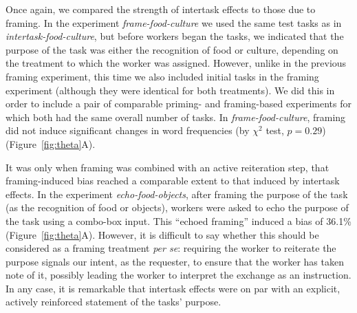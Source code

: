 \documentclass{sigchi}
\begin{document}
Once again, we compared the strength of intertask effects to those due to 
framing. In the experiment \textit{frame-food-culture} we used
the same test tasks as in \textit{intertask-food-culture}, but before
workers began the tasks, we indicated
that the purpose of the task was either the recognition of food or 
culture, depending on the treatment to which the worker was assigned.  
However, unlike in the previous framing experiment, this time we also 
included initial tasks in the framing experiment (although they were 
identical for both treatments).  We did this in order to include a pair of
comparable priming- and framing-based experiments
for which both had the same overall number of tasks.
In \textit{frame-food-culture}, framing did not induce 
significant changes in word frequencies 
(by $\chi^2$ test, $p=0.29$) (Figure~\ref{fig:theta}A).

It was only when framing was combined with an active reiteration step, 
that framing-induced bias reached a comparable extent to that induced by 
intertask effects.  In the experiment \textit{echo-food-objects},
after framing the purpose of the task (as the recognition of food
or objects), workers were asked to echo the purpose of the task
using a combo-box input.  This  ``echoed framing'' induced a bias of 
36.1\% (Figure~\ref{fig:theta}A). However, it is difficult to say whether this 
should be considered as a framing treatment \textit{per se}:
requiring the worker to reiterate the purpose signals our intent, as the 
requester, to ensure that the worker has taken note of it, possibly leading 
the worker to interpret the exchange as an instruction.  
In any case, it is remarkable that intertask effects
were on par with an explicit, actively reinforced statement of the tasks' 
purpose.
\end{document}
